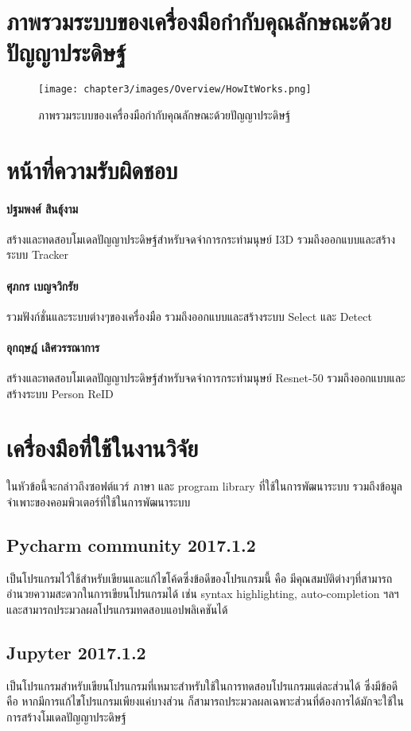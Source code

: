 \section{ภาพรวมระบบของเครื่องมือกำกับคุณลักษณะด้วยปัญญาประดิษฐ์}
\begin{figure}[!ht]
    \centering
    \texttt{[image: chapter3/images/Overview/HowItWorks.png]}
    \caption{ภาพรวมระบบของเครื่องมือกำกับคุณลักษณะด้วยปัญญาประดิษฐ์}
    \label{fig:labeling_overview}
\end{figure}
\clearpage

\section{หน้าที่ความรับผิดชอบ} 
\paragraph*{ปฐมพงศ์ สินธุ์งาม}
สร้างและทดสอบโมเดลปัญญาประดิษฐ์สำหรับจดจำการกระทำมนุษย์ I3D รวมถึงออกแบบและสร้างระบบ Tracker
\paragraph*{ศุภกร เบญจวิกรัย}
รวมฟังก์ชั่นและระบบต่างๆของเครื่องมือ รวมถึงออกแบบและสร้างระบบ Select และ Detect
\paragraph*{อุกฤษฎ์ เลิศวรรณาการ}
สร้างและทดสอบโมเดลปัญญาประดิษฐ์สำหรับจดจำการกระทำมนุษย์ Resnet-50 รวมถึงออกแบบและสร้างระบบ Person ReID 

\vspace{6mm}
\section{เครื่องมือที่ใช้ในงานวิจัย}
ในหัวข้อนี้จะกล่าวถึงซอฟต์แวร์ ภาษา และ program library ที่ใช้ในการพัฒนาระบบ รวมถึงข้อมูลจำเพาะของคอมพิวเตอร์ที่ใช้ในการพัฒนาระบบ
\subsection*{Pycharm community 2017.1.2} 
เป็นโปรแกรมไว้ใช้สำหรับเขียนและแก้ไขโค้ดซึ่งข้อดีของโปรแกรมนี้ คือ มีคุณสมบัติต่างๆที่สามารถอำนวยความสะดวกในการเขียนโปรแกรมได้ เช่น 
syntax highlighting, auto-completion ฯลฯ และสามารถประมวลผลโปรแกรมทดสอบแอปพลิเคชันได้

\subsection*{Jupyter 2017.1.2} เป็นโปรแกรมสำหรับเขียนโปรแกรมที่เหมาะสำหรับใช้ในการทดสอบโปรแกรมแต่ละส่วนได้ ซึ่งมีข้อดีคือ 
หากมีการแก้ไขโปรแกรมเพียงแค่บางส่วน ก็สามารถประมวลผลเฉพาะส่วนที่ต้องการได้มักจะใช้ในการสร้างโมเดลปัญญาประดิษฐ์

